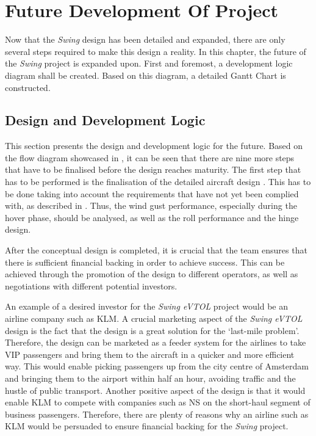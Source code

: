 \chapter{Future Development Of Project}
\label{ch:Future_Development_Of_Project}
Now that the \textit{Swing} design has been detailed and expanded, there are only several steps required to make this design a reality.
In this chapter, the future of the \textit{Swing} project is expanded upon.
First and foremost, a development logic diagram shall be created.
Based on this diagram, a detailed Gantt Chart is constructed.

\section{Design and Development Logic}
This section presents the design and development logic for the future.
Based on the flow diagram showcased in , it can be seen that there are nine more steps that have to be finalised before the design reaches maturity.
The first step that has to be performed is the finalisation of the detailed aircraft design .
This has to be done taking into account the requirements that have not yet been complied with, as described in .
Thus, the wind gust performance, especially during the hover phase, should be analysed, as well as the roll performance and the hinge design.

After the conceptual design is completed, it is crucial that the team ensures that there is sufficient financial backing in order to achieve success.
This can be achieved through the promotion of the design to different operators, as well as negotiations with different potential investors.

An example of a desired investor for the \textit{Swing eVTOL} project would be an airline company such as KLM.
A crucial marketing aspect of the \textit{Swing eVTOL} design is the fact
that the design is a great solution for the \enquote*{last-mile problem}.
Therefore,
the design can be marketed as a feeder system for the airlines to take VIP passengers
and bring them to the aircraft in a quicker and more efficient way.
This would enable picking passengers up from the city centre of Amsterdam
and bringing them to the airport within half an hour, avoiding traffic and the hustle of public transport.
Another positive aspect of the design is that it would enable KLM
to compete with companies such as NS on the short-haul segment of business passengers.
Therefore,
there are plenty of reasons
why an airline such as KLM would be persuaded to ensure financial backing for the \textit{Swing} project.

